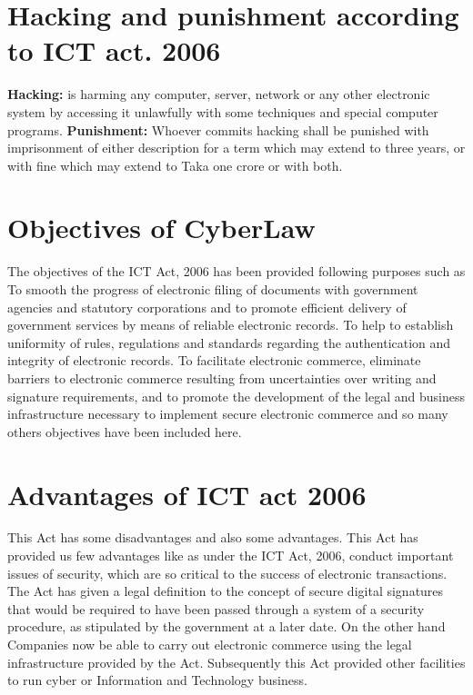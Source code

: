 \documentclass[14 pt, letterpaper]{extarticle}
\begin{document}
	\begin{justify}
		
	\section{Hacking and punishment according to ICT act. 2006}
	\textbf{Hacking:} is harming any computer, server, network or any other electronic system by accessing it unlawfully with some techniques and special computer programs.
	\textbf{Punishment:} Whoever commits hacking shall be punished with imprisonment of either description for a term which may extend to three years, or with fine which may extend to Taka one crore or with both.
	
	\section{Objectives of CyberLaw}
	The objectives of the ICT Act, 2006 has been provided following purposes such as To smooth the progress of electronic filing of documents with government agencies and statutory corporations and to promote efficient delivery of government services by means of reliable electronic records. To help to establish uniformity of rules, regulations and standards regarding the authentication and integrity of electronic records. To facilitate electronic commerce, eliminate barriers to electronic commerce resulting from uncertainties over writing and signature requirements, and to promote the development of the legal and business infrastructure necessary to implement secure electronic commerce and so many others objectives have been included here.
	
	\section{Advantages of ICT act 2006}
	This Act has some disadvantages and also some advantages. This Act has provided us few advantages like as under the ICT Act, 2006, conduct important issues of security, which are so critical to the success of electronic transactions. The Act has given a legal definition to the concept of secure digital signatures that would be required to have been passed through a system of a security procedure, as stipulated by the government at a later date. On the other hand Companies now be able to carry out electronic commerce using the legal infrastructure provided by the Act. Subsequently this Act provided other facilities to run cyber or Information and Technology business.
	

\end{justify}
\end{document}
